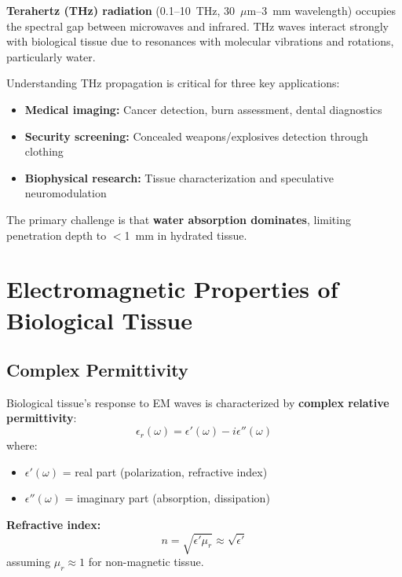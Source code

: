 \textbf{Terahertz (THz) radiation} (0.1--10~THz, 30~$\mu$m--3~mm wavelength) occupies the spectral gap between microwaves and infrared. THz waves interact strongly with biological tissue due to resonances with molecular vibrations and rotations, particularly water.

\begin{keyconcept}
Understanding THz propagation is critical for three key applications:
\begin{itemize}
\item \textbf{Medical imaging:} Cancer detection, burn assessment, dental diagnostics
\item \textbf{Security screening:} Concealed weapons/explosives detection through clothing
\item \textbf{Biophysical research:} Tissue characterization and speculative neuromodulation
\end{itemize}
The primary challenge is that \textbf{water absorption dominates}, limiting penetration depth to $<$1~mm in hydrated tissue.
\end{keyconcept}

\section{Electromagnetic Properties of Biological Tissue}
\label{sec:em-properties}

\subsection{Complex Permittivity}
\label{subsec:complex-permittivity}

Biological tissue's response to EM waves is characterized by \textbf{complex relative permittivity}:
\begin{equation}
\label{eq:complex-permittivity}
\epsilon_r(\omega) = \epsilon'(\omega) - i\epsilon''(\omega)
\end{equation}
where:
\begin{itemize}
\item $\epsilon'(\omega)$ = real part (polarization, refractive index)
\item $\epsilon''(\omega)$ = imaginary part (absorption, dissipation)
\end{itemize}

\textbf{Refractive index:}
\begin{equation}
\label{eq:refractive-index}
n = \sqrt{\epsilon' \mu_r} \approx \sqrt{\epsilon'}
\end{equation}
assuming $\mu_r \approx 1$ for non-magnetic tissue.


